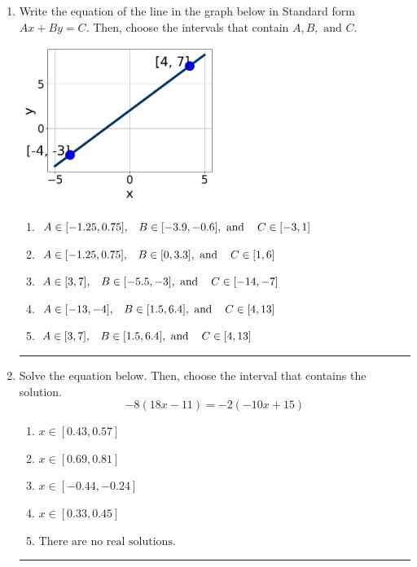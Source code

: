 \documentclass[14pt]{extbook}
\newcommand{\litem}[1]{\item#1\hspace*{-1cm}\rule{\textwidth}{0.4pt}}
\begin{document}
\begin{enumerate}
{\begin{enumerate}[label=\Alph*.]
\end{enumerate} }
\litem{
Write the equation of the line in the graph below in Standard form $Ax+By=C$. Then, choose the intervals that contain $A, B, \text{ and } C$.
\begin{center}
    \includegraphics[width=0.5\textwidth]{../Figures/linearGraphToStandardA.png}
\end{center}
\begin{enumerate}[label=\Alph*.]
\item \( A \in [-1.25, 0.75], \hspace{3mm} B \in [-3.9, -0.6], \text{ and } \hspace{3mm} C \in [-3, 1] \)
\item \( A \in [-1.25, 0.75], \hspace{3mm} B \in [0, 3.3], \text{ and } \hspace{3mm} C \in [1, 6] \)
\item \( A \in [3, 7], \hspace{3mm} B \in [-5.5, -3], \text{ and } \hspace{3mm} C \in [-14, -7] \)
\item \( A \in [-13, -4], \hspace{3mm} B \in [1.5, 6.4], \text{ and } \hspace{3mm} C \in [4, 13] \)
\item \( A \in [3, 7], \hspace{3mm} B \in [1.5, 6.4], \text{ and } \hspace{3mm} C \in [4, 13] \)

\end{enumerate} }
\litem{
Solve the equation below. Then, choose the interval that contains the solution.\[ -8(18x -11) = -2(-10x + 15) \]\begin{enumerate}[label=\Alph*.]
\item \( x \in [0.43, 0.57] \)
\item \( x \in [0.69, 0.81] \)
\item \( x \in [-0.44, -0.24] \)
\item \( x \in [0.33, 0.45] \)
\item \( \text{There are no real solutions.} \)


\end{enumerate}}
\end{enumerate}
\end{document}
